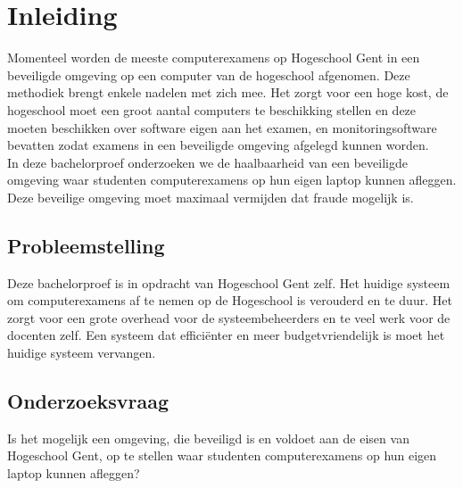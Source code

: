 
\chapter{Inleiding}
\label{ch:inleiding}



 Momenteel worden de meeste computerexamens op Hogeschool Gent in een beveiligde omgeving op een computer van de hogeschool afgenomen. Deze methodiek brengt enkele nadelen met zich mee. Het zorgt voor een hoge kost, de hogeschool moet een groot aantal computers te beschikking stellen en deze moeten beschikken over software eigen aan het examen, en monitoringsoftware bevatten zodat examens in een beveiligde omgeving afgelegd kunnen worden. \\ In deze bachelorproef onderzoeken we de haalbaarheid van een beveiligde omgeving waar studenten computerexamens op hun eigen laptop kunnen afleggen. Deze beveilige omgeving moet maximaal vermijden dat fraude mogelijk is. \\


\section{Probleemstelling}
\label{sec:probleemstelling}

Deze bachelorproef is in opdracht van Hogeschool Gent zelf. Het huidige systeem om computerexamens af te nemen op de Hogeschool is verouderd en te duur. Het zorgt voor een grote overhead voor de systeembeheerders en te veel werk voor de docenten zelf. Een systeem dat effici\"{e}nter en meer budgetvriendelijk is moet het huidige systeem vervangen.



\section{Onderzoeksvraag}
\label{sec:onderzoeksvraag}
Is het mogelijk een omgeving, die beveiligd is en voldoet aan de eisen van Hogeschool Gent, op te stellen waar studenten computerexamens op hun eigen laptop kunnen afleggen? 

